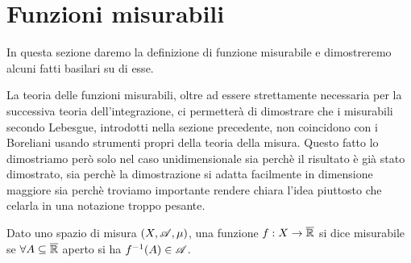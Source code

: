 \section{Funzioni misurabili}

In questa sezione daremo la definizione di funzione misurabile e dimostreremo alcuni fatti basilari su di esse.

La teoria delle funzioni misurabili, oltre ad essere strettamente necessaria per la successiva teoria dell'integrazione, ci permetterà di dimostrare che i misurabili secondo Lebesgue, introdotti nella sezione precedente, non coincidono con i Boreliani usando strumenti propri della teoria della misura.
Questo fatto lo dimostriamo però solo nel caso unidimensionale sia perchè il risultato è già stato dimostrato, sia perchè la dimostrazione si adatta facilmente in dimensione maggiore sia perchè troviamo importante rendere chiara l'idea piuttosto che celarla in una notazione troppo pesante.

\begin{definition}
	Dato uno spazio di misura $(X,\mathscr A,\mu)$, una funzione $f:X\rightarrow \overline{\mathbb R}$ si dice misurabile se
	$\forall A \subseteq \overline{\mathbb R}$ aperto si ha $f^{-1}(A)\in \mathscr A$.
\end{definition}


